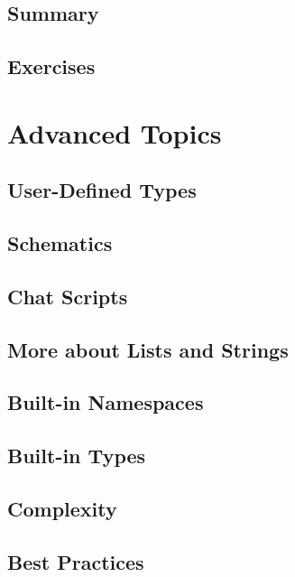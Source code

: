 \documentclass[oneside]{book}
\begin{document}
\section{Summary}
\blindtext

\section{Exercises}
\blindtext

\chapter{Advanced Topics}
\blindtext

\section{User-Defined Types}
\blindtext

\section{Schematics}
\blindtext

\section{Chat Scripts}
\blindtext

\section{More about Lists and Strings}
\blindtext

\section{Built-in Namespaces}
\blindtext

\section{Built-in Types}
\blindtext

\section{Complexity}
\blindtext

\section{Best Practices}
\blindtext
\end{document}
